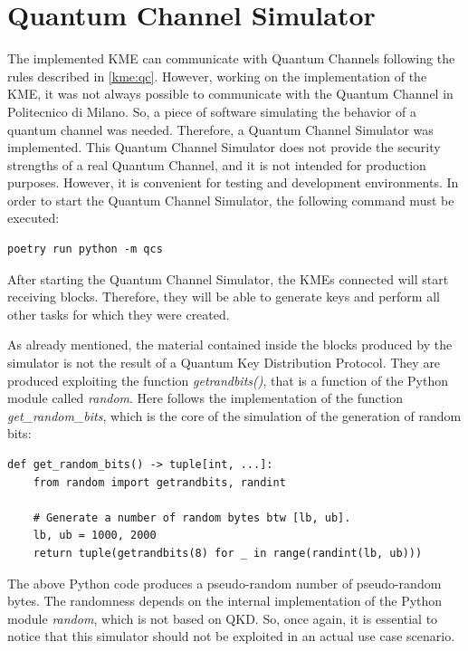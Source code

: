 \section{Quantum Channel Simulator}
\label{kme:qcs}

The implemented KME can communicate with Quantum Channels following the rules described in \ref{kme:qc}. However, working on the implementation of the KME, it was not always possible to communicate with the Quantum Channel in Politecnico di Milano. So, a piece of software simulating the behavior of a quantum channel was needed. Therefore, a Quantum Channel Simulator was implemented. This Quantum Channel Simulator does not provide the security strengths of a real Quantum Channel, and it is not intended for production purposes. However, it is convenient for testing and development environments. In order to start the Quantum Channel Simulator, the following command must be executed:

\begin{verbatim}
poetry run python -m qcs
\end{verbatim}

After starting the Quantum Channel Simulator, the KMEs connected will start receiving blocks. Therefore, they will be able to generate keys and perform all other tasks for which they were created.

As already mentioned, the material contained inside the blocks produced by the simulator is not the result of a Quantum Key Distribution Protocol. They are produced exploiting the function \textit{getrandbits()}, that is a function of the Python module called \textit{random}. Here follows the implementation of the function \textit{get\_random\_bits}, which is the core of the simulation of the generation of random bits:

\begin{verbatim}
def get_random_bits() -> tuple[int, ...]:
    from random import getrandbits, randint

    # Generate a number of random bytes btw [lb, ub].
    lb, ub = 1000, 2000
    return tuple(getrandbits(8) for _ in range(randint(lb, ub)))
\end{verbatim}

The above Python code produces a pseudo-random number of pseudo-random bytes. The randomness depends on the internal implementation of the Python module \textit{random}, which is not based on QKD. So, once again, it is essential to notice that this simulator should not be exploited in an actual use case scenario.

